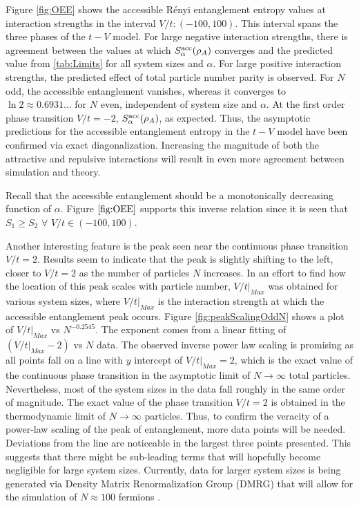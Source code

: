Figure \ref{fig:OEE} shows the accessible R\'enyi entanglement entropy values at interaction strengths in the interval $V/t: \left( -100,100 \right)$. This interval spans the three phases of the $t-V$ model. For large negative interaction strengths, there is agreement between the values at which $S_{\alpha}^{\rm acc}(\rho_A)$ converges and the predicted value from \ref{tab:Limits} for all system sizes and $\alpha$. For large positive interaction strengths, the predicted effect of total particle number parity is observed. For $N$ odd, the accessible entanglement vanishes, whereas it converges to $\ln{2} \approx 0.6931 \dots$ for $N$ even, independent of system size and $\alpha$. At the first order phase transition $V/t=-2$, $S_{\alpha}^{\rm acc}(\rho_A)$, as expected. Thus, the asymptotic predictions for the accessible entanglement entropy in the $t-V$ model have been confirmed via exact diagonalization. Increasing the magnitude of both the attractive and repulsive interactions will result in even more agreement between simulation and theory.

Recall that the accessible entanglement should be a monotonically decreasing function of $\alpha$. Figure $\ref{fig:OEE}$ supports this inverse relation since it is seen that $S_{1} \geq S_{2}$ $\forall$ $V/t \in \left( -100,100 \right)$.

Another interesting feature is the peak seen near the continuous phase transition $V/t=2$. Results seem to indicate that the peak is slightly shifting to the left, closer to $V/t=2$ as the number of particles $N$ increases. In an effort to find how the location of this peak scales with particle number, $V/t\vert_{Max}$ was obtained for various system sizes, where $V/t\vert_{Max}$ is the interaction strength at which the accessible entanglement peak occurs. Figure \ref{fig:peakScalingOddN} shows a plot of $V/t\vert_{Max}$ vs $N^{-0.2545}$. The exponent comes from a linear fitting of $\left( V/t\vert_{Max} - 2 \right)$ vs $N$ data. The observed inverse power law scaling is promising as all points fall on a line with $y$ intercept of $V/t\vert_{Max} = 2$, which is the exact value of the continuous phase transition in the asymptotic limit of $N \to \infty$ total particles. Nevertheless, most of the system sizes in the data fall roughly in the same order of magnitude. The exact value of the phase transition $V/t = 2$ is obtained in the thermodynamic limit of $N\to\infty$ particles. Thus, to confirm the veracity of a power-law scaling of the peak of entanglement, more data points will be needed. Deviations from the line are noticeable in the largest three points presented. This suggests that there might be sub-leading terms that will hopefully become negligible for large system sizes. Currently, data for larger system sizes is being generated via Density Matrix Renormalization Group (DMRG) that will allow for the simulation of $N\approx100$ fermions \cite{SCHOLLWOCK201196} .

